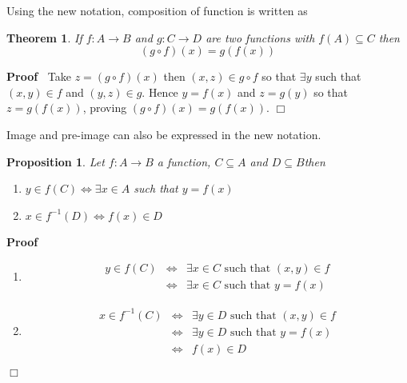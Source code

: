 \documentclass{book}
\newenvironment{proof}{\noindent\textbf{Proof\ }}{\hspace*{\fill}$\Box$\medskip}
\newtheorem{proposition}{Proposition}
{\theorembodyfont{\rmfamily}\newtheorem{remark}{Remark}}
\newtheorem{theorem}{Theorem}
\begin{document}
Using the new notation, composition of function is written as

\begin{theorem}
  \label{function alternative for composition}If $f : A \rightarrow B$ and $g
  : C \rightarrow D$ are two functions with $f (A) \subseteq C$ then
  \[ (g \circ f) (x) = g (f (x)) \]
\end{theorem}

\begin{proof}
  Take $z = (g \circ f) (x)$ then $(x, z) \in g \circ f$ so that $\exists y$
  such that $(x, y) \in f$ and $(y, z) \in g$. Hence $y = f (x)$ and $z = g
  (y)$ so that $z = g (f (x))$, proving $(g \circ f) (x) = g (f (x))$.
\end{proof}

Image and pre-image can also be expressed in the new notation.

\begin{proposition}
  \label{function image preimage alternative}Let $f : A \rightarrow B$ a
  function, $C \subseteq A$ and $D \subseteq B$\quad then
  \begin{enumerate}
    \item $y \in f (C) \Leftrightarrow \exists x \in A$ such that $y = f (x)$
    
    \item $x \in f^{- 1} (D) \Leftrightarrow f (x) \in D$
  \end{enumerate}
\end{proposition}

\begin{proof}
  
  \begin{enumerate}
    \item 
    \begin{eqnarray*}
      y \in f (C) & \Leftrightarrow & \exists x \in C \text{ such that } (x,
      y) \in f\\
      & \Leftrightarrow & \exists x \in C \text{ such that } y = f (x)
    \end{eqnarray*}
    \item
    \begin{eqnarray*}
      x \in f^{- 1} (C) & \Leftrightarrow & \exists y \in D \text{ such that }
      (x, y) \in f\\
      & \Leftrightarrow & \exists y \in D \text{ such that } y = f (x)\\
      & \Leftrightarrow & f (x) \in D
    \end{eqnarray*}
  \end{enumerate}
\end{proof}
\end{document}
